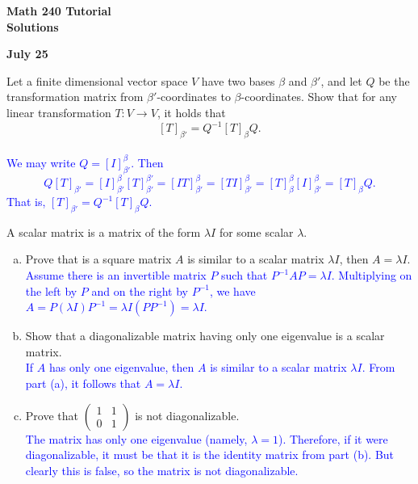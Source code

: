 \documentclass[a4paper,11pt]{article}
\newcommand{\blue}[1]{\textcolor{blue}{#1}}
\begin{document}
\begin{center}
  {\Large\bfseries Math 240 Tutorial \\ Solutions}
\end{center}
\begin{center}
  {\bfseries July 25}
\end{center}

 Let a finite dimensional vector space $V$ have two
bases $\beta$ and $\beta'$, and let $Q$ be the transformation matrix from
$\beta'$-coordinates to $\beta$-coordinates. Show that for any linear
transformation $T: V \rightarrow V$, it holds that
\[
  [T]_{\beta'} = Q^{-1}[T]_{\beta}Q.
\] \\

\blue{We may write $Q=[I]_{\beta'}^\beta$. Then
  \[
    Q[T]_{\beta'} = [I]_{\beta'}^\beta[T]_{\beta'}^{\beta'} =
    [IT]_{\beta'}^\beta = [TI]_{\beta'}^\beta=[T]_\beta^\beta[I]_{\beta'}^\beta
    = [T]_\beta Q.
  \]
  That is, $[T]_{\beta'}=Q^{-1}[T]_\beta Q$. \\}

 A scalar matrix is a matrix of the form $\lambda
I$ for some scalar $\lambda$.
\begin{enumerate}[(a)]
\item Prove that is a square matrix $A$ is similar to a scalar matrix $\lambda
  I$, then $A=\lambda I$. \\

  \blue{Assume there is an invertible matrix $P$ such that $P^{-1}AP = \lambda
    I$. Multiplying on the left by $P$ and on the right by $P^{-1}$, we have
    $A=P(\lambda I)P^{-1} = \lambda I(PP^{-1}) = \lambda I$. \\}
  
\item Show that a diagonalizable matrix having only one eigenvalue is a scalar
  matrix. \\

  \blue{If $A$ has only one eigenvalue, then $A$ is similar to a scalar matrix
    $\lambda I$. From part (a), it follows that $A=\lambda I$. \\}
  
\item Prove that $\left( \begin{smallmatrix}1&1\\0&1\end{smallmatrix} \right)$
  is not diagonalizable. \\

  \blue{The matrix has only one eigenvalue (namely, $\lambda = 1$). Therefore,
    if it were diagonalizable, it must be that it is the identity matrix from
    part (b). But clearly this is false, so the matrix is not diagonalizable. \\}
\end{enumerate}
\end{document}
